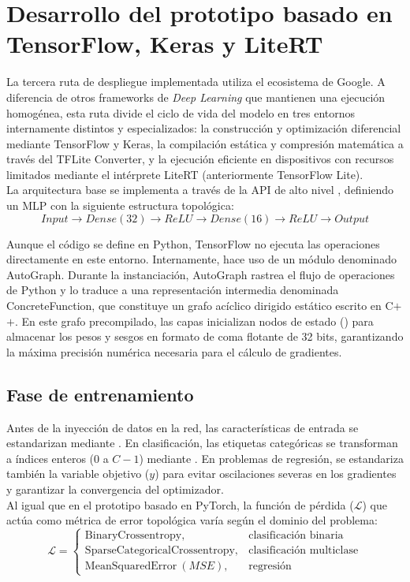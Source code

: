 \documentclass[a4paper,12pt,twoside,final]{book}
\begin{document}
\section{Desarrollo del prototipo basado en TensorFlow, Keras y LiteRT}
La tercera ruta de despliegue implementada utiliza el ecosistema de Google. A diferencia de otros frameworks de
\textit{Deep Learning} que mantienen una ejecución homogénea, esta ruta divide el ciclo de vida del modelo en tres
entornos internamente distintos y especializados: la construcción y optimización diferencial mediante TensorFlow y
Keras, la compilación estática y compresión matemática a través del TFLite Converter, y la ejecución eficiente en
dispositivos con recursos limitados mediante el intérprete LiteRT (anteriormente TensorFlow Lite).\\

La arquitectura base se implementa a través de la API de alto nivel , definiendo un
MLP con la siguiente estructura topológica:
\[
Input \rightarrow Dense(32) \rightarrow ReLU \rightarrow Dense(16) \rightarrow ReLU \rightarrow Output
\]

Aunque el código se define en Python, TensorFlow no ejecuta las operaciones directamente en este entorno. Internamente,
hace uso de un módulo denominado AutoGraph. Durante la instanciación, AutoGraph rastrea el flujo de operaciones de
Python y lo traduce a una representación intermedia denominada ConcreteFunction, que constituye un grafo acíclico
dirigido estático escrito en C$+$$+$. En este grafo precompilado, las capas  inicializan nodos de estado
() para almacenar los pesos y sesgos en formato de coma flotante de 32 bits, garantizando la máxima
precisión numérica necesaria para el cálculo de gradientes.

\subsection{Fase de entrenamiento}
Antes de la inyección de datos en la red, las características de entrada se estandarizan mediante .
En clasificación, las etiquetas categóricas se transforman a índices enteros (0 a $C-1$) mediante .
En problemas de regresión, se estandariza también la variable objetivo ($y$) para evitar oscilaciones severas en los
gradientes y garantizar la convergencia del optimizador.\\

Al igual que en el prototipo basado en PyTorch, la función de pérdida ($\mathcal{L}$) que actúa como métrica de error
topológica varía según el dominio del problema:
\[
\mathcal{L} = \begin{cases} 
  \mathrm{BinaryCrossentropy}, & \text{clasificación binaria} \\ 
  \mathrm{SparseCategoricalCrossentropy}, & \text{clasificación multiclase} 
  \\ \mathrm{MeanSquaredError} \ (MSE), & \text{regresión} \end{cases}
\]
\end{document}
